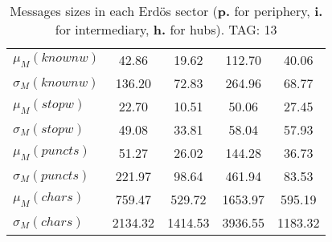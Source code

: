 \begin{table}[h!]
\begin{center}
\begin{tabular}{| l || c | c | c | c |}
$\mu_M(knownw)$ & 42.86  & 19.62  & 112.70  & 40.06 \\
$\sigma_M(knownw)$ & 136.20  & 72.83  & 264.96  & 68.77 \\\hline
$\mu_M(stopw)$ & 22.70  & 10.51  & 50.06  & 27.45 \\
$\sigma_M(stopw)$ & 49.08  & 33.81  & 58.04  & 57.93 \\\hline
$\mu_M(puncts)$ & 51.27  & 26.02  & 144.28  & 36.73 \\
$\sigma_M(puncts)$ & 221.97  & 98.64  & 461.94  & 83.53 \\\hline
$\mu_M(chars)$ & 759.47  & 529.72  & 1653.97  & 595.19 \\
$\sigma_M(chars)$ & 2134.32  & 1414.53  & 3936.55  & 1183.32 \\\hline
\end{tabular}
\caption{Messages sizes in each Erd\"os sector ({{\bf p.}} for periphery, {{\bf i.}} for intermediary, {{\bf h.}} for hubs). TAG: 13}
\end{center}
\end{table}